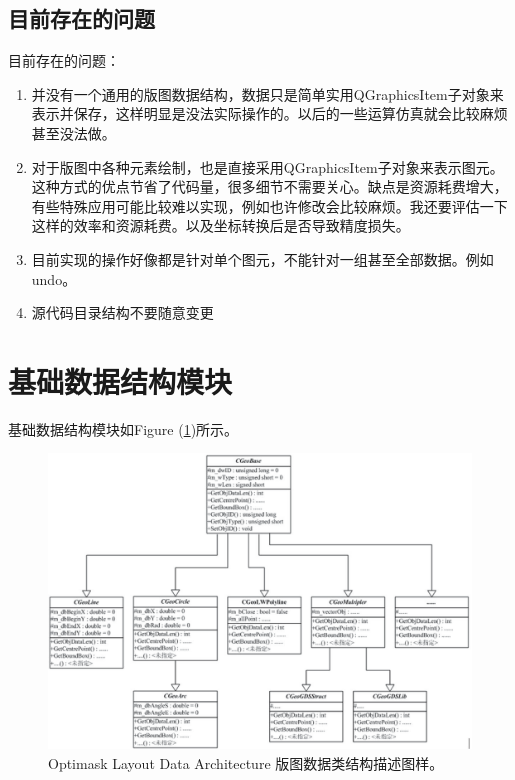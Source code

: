 \subsection{目前存在的问题} \label{SectArchIssue} 
目前存在的问题：
\begin{enumerate}
	\item 并没有一个通用的版图数据结构，数据只是简单实用QGraphicsItem子对象来表示并保存，这样明显是没法实际操作的。以后的一些运算仿真就会比较麻烦甚至没法做。
	\item 对于版图中各种元素绘制，也是直接采用QGraphicsItem子对象来表示图元。这种方式的优点节省了代码量，很多细节不需要关心。缺点是资源耗费增大，有些特殊应用可能比较难以实现，例如也许修改会比较麻烦。我还要评估一下这样的效率和资源耗费。以及坐标转换后是否导致精度损失。
	\item 目前实现的操作好像都是针对单个图元，不能针对一组甚至全部数据。例如undo。
	\item 源代码目录结构不要随意变更
\end{enumerate}

\section{基础数据结构模块} \label{SectArchData}
基础数据结构模块如Figure (\ref{FigLayoutDataArch})所示。
\begin{figure}[htb!p] %
	\centering
	\includegraphics[width=6in]{./Layout/FigsArch/LayoutDataStructure.eps}
	\caption{Optimask Layout Data Architecture 版图数据类结构描述图样。}
	\label{FigLayoutDataArch}
\end{figure}

